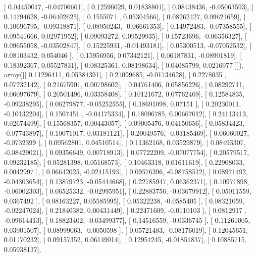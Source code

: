 \documentclass{article}
\begin{document}
       [ 0.04450047, -0.04706661],
       [ 0.12596029,  0.01838801],
       [ 0.08438436, -0.05063593],
       [ 0.14794628, -0.06402625],
       [ 0.1555071 ,  0.05304566],
       [ 0.08262427,  0.09621659],
       [ 0.10696795, -0.09318871],
       [ 0.08950243, -0.06661353],
       [ 0.14972483, -0.07358555],
       [ 0.09541666,  0.02971952],
       [ 0.09093272,  0.09529935],
       [ 0.15723696, -0.06356327],
       [ 0.09655058, -0.03502847],
       [ 0.15225931, -0.01493181],
       [ 0.05300513, -0.07052532],
       [ 0.08103432,  0.054046  ],
       [ 0.15956956,  0.07342121],
       [ 0.06187831, -0.08901819],
       [ 0.18392367,  0.05527831],
       [ 0.08325361,  0.08198634],
       [ 0.04085799,  0.0216977 ]]), array([[ 0.11296411,  0.05384391],
       [ 0.21099685, -0.01734628],
       [ 0.2278035 ,  0.07232142],
       [ 0.21675901,  0.00798602],
       [ 0.04761406,  0.05856226],
       [ 0.08292711,  0.06097679],
       [ 0.20501496,  0.03358408],
       [ 0.10121672,  0.07762469],
       [ 0.12584835, -0.09238295],
       [ 0.06279877, -0.05252555],
       [ 0.18691098,  0.07151   ],
       [ 0.20230011, -0.10132204],
       [ 0.1507451 , -0.04175334],
       [ 0.18096785,  0.00667012],
       [ 0.24113413,  0.02674499],
       [ 0.15568357,  0.00443057],
       [ 0.09005476,  0.04150656],
       [ 0.05834423, -0.07743897],
       [ 0.10071017,  0.03181121],
       [ 0.20049576, -0.03185469],
       [ 0.06060027, -0.0732399 ],
       [ 0.09562801,  0.04510514],
       [ 0.11362168,  0.03529879],
       [ 0.08493307, -0.08429021],
       [ 0.09356649,  0.00718913],
       [ 0.07722209, -0.07077754],
       [ 0.20579517,  0.09232185],
       [ 0.05281398,  0.05168573],
       [ 0.10463318,  0.01611619],
       [ 0.22908033,  0.0042997 ],
       [ 0.06642025, -0.02415193],
       [ 0.09576396, -0.08758512],
       [ 0.08971492, -0.04303654],
       [ 0.13879723, -0.05444668],
       [ 0.22785947,  0.06362371],
       [ 0.10971898, -0.06002303],
       [ 0.06525332, -0.02995951],
       [ 0.22883756, -0.03679912],
       [ 0.05011559,  0.0367492 ],
       [ 0.08163227,  0.05585995],
       [ 0.05322238, -0.0585405 ],
       [ 0.08321059, -0.02247024],
       [ 0.21840382,  0.00431449],
       [ 0.22471609, -0.0110103 ],
       [ 0.0812917 , -0.09614413],
       [ 0.18823402, -0.03499377],
       [ 0.14516559, -0.0336745 ],
       [ 0.11261005,  0.03901507],
       [ 0.08999063, -0.0050598 ],
       [ 0.05721483, -0.08176019],
       [ 0.12045651,  0.01170232],
       [ 0.09157352,  0.06149014],
       [ 0.12954245, -0.01851837],
       [ 0.10885715,  0.05938137],
\end{document}
